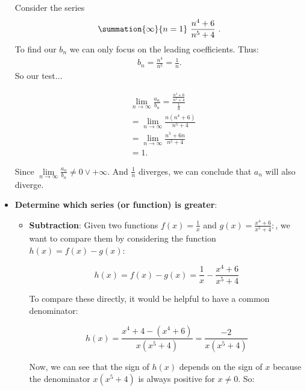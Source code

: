 \documentclass{report}
\begin{document}
\begin{itemize}
        \bigbreak \noindent 
        Consider the series 
        \begin{align*}
            \summation{\infty}{n=1}\ \frac{n^{4} + 6}{n^{5} + 4}\ 
        .\end{align*}
        To find our $b_{n}$ we can only focus on the leading coefficients. Thus: 
        \begin{align*}
            b_{n} = \frac{n^{4}}{n^{5}} = \frac{1}{n}
        .\end{align*}
        So our test...
        \smallbreak \noindent
        \begin{minipage}[t]{0.47\textwidth}
            \begin{align*}
        &\lim\limits_{n \to \infty}{\frac{a_{n}}{b_{n}}} = \frac{\frac{n^{4} + 6}{n^{5} + 4}}{\frac{1}{n}} \\
        &=\lim\limits_{n \to \infty}{\frac{n(n^{4}+6)}{n^{5} + 4}} \\
        &=\lim\limits_{n \to \infty}{\frac{n^{5}+6n}{n^{5} + 4}} \\
        &=1
    .\end{align*}
\end{minipage}
\begin{minipage}[t]{0.47\textwidth}
    Since $\lim\limits_{n \to \infty}{\frac{a_{n}}{b_{n}}} \ne 0 \lor +\infty$. And $\frac{1}{n}$ diverges, we can conclude that $a_{n}$ will also diverge.
\end{minipage}

\item \textbf{Determine which series (or function) is greater}:

    \begin{itemize}
        \item \textbf{Subtraction}: Given two functions $f(x) = \frac{1}{x}$ and $g(x) = \frac{x^4 + 6}{x^5 + 4}:$, we want to compare them by considering the function $h(x) = f(x) - g(x)$:

            \[
                h(x) = f(x) - g(x) = \frac{1}{x} - \frac{x^4 + 6}{x^5 + 4}
            \]

            To compare these directly, it would be helpful to have a common denominator:

            \[
                h(x) = \frac{x^4 + 4 - (x^4 + 6)}{x(x^5 + 4)} = \frac{-2}{x(x^5 + 4)}
            \]

            Now, we can see that the sign of $h(x)$ depends on the sign of $x$ because the denominator $x(x^5 + 4)$ is always positive for $x \neq 0$. So:


\end{itemize}
\end{itemize}
\end{document}
